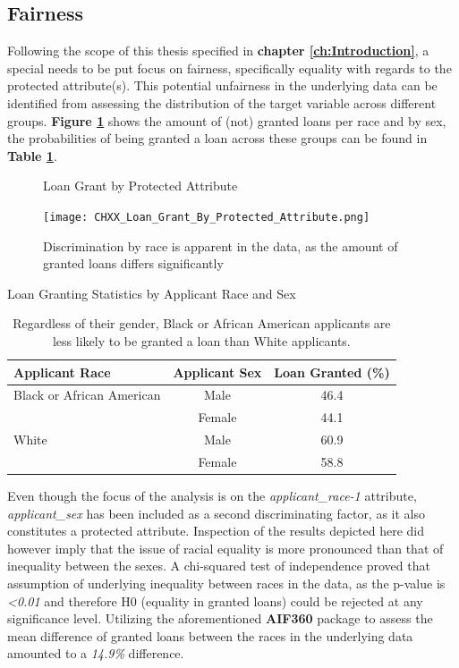 \subsection{Fairness}\label{subsec:Fairness}

Following the scope of this thesis specified in \textbf{chapter \ref{ch:Introduction}}, a special needs to be put focus on fairness, specifically equality with regards to the protected attribute(s).
This potential unfairness in the underlying data can be identified from assessing the distribution of the target variable across different groups.
\textbf{Figure \ref{fig:CHXX_Loan_Grant_By_Protected_Attribute}} shows the amount of (not) granted loans per race and by sex, the probabilities of being granted a loan across these groups can be found in \textbf{Table \ref{tab:loan_granting}}.\@

\begin{figure}[h]
    \centering
    \caption{Loan Grant by Protected Attribute}
    \texttt{[image: CHXX\_Loan\_Grant\_By\_Protected\_Attribute.png]}
    \caption*{Discrimination by race is apparent in the data, as the amount of granted loans differs significantly}
    \label{fig:CHXX_Loan_Grant_By_Protected_Attribute}
\end{figure}

\begin{table}[htbp]
    \centering
      \caption{Loan Granting Statistics by Applicant Race and Sex}
      \begin{tabular}{lcc}
      \toprule
      \textbf{Applicant Race} & \textbf{Applicant Sex} & \textbf{Loan Granted (\%)} \\
      \midrule
      Black or African American & Male    & 46.4 \\
            & Female  & 44.1 \\
      White & Male    & 60.9 \\
            & Female  & 58.8 \\
      \bottomrule
      \end{tabular}
      \caption*{Regardless of their gender, Black or African American applicants are less likely to be granted a loan than White applicants.}
    \label{tab:loan_granting}%
\end{table}%

Even though the focus of the analysis is on the \textit{applicant\_race-1} attribute, \textit{applicant\_sex} has been included as a second discriminating factor, as it also constitutes a protected attribute.
Inspection of the results depicted here did however imply that the issue of racial equality is more pronounced than that of inequality between the sexes.
A chi-squared test of independence proved that assumption of underlying inequality between races in the data, as the p-value is \textit{<0.01} and therefore H0 (equality in granted loans) could be rejected at any significance level.
Utilizing the aforementioned \textbf{AIF360} package to assess the mean difference of granted loans between the races in the underlying data amounted to a \textit{14.9\%} difference.

